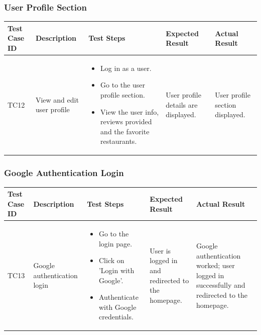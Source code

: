 \documentclass[12pt, a4paper, oneside]{article}
\begin{document}
\subsubsection{User Profile Section}
\captionsetup{type=table}
\begin{tabularx}{\textwidth}{|X|X|X|X|X|}
	\hline
	\rowcolor{gray}
	\textbf{Test Case ID} & \textbf{Description} & \textbf{Test Steps} & \textbf{Expected Result} & \textbf{Actual Result} \\ \hline
	TC12 & View and edit user profile & 
    \begin{itemize}[left=0pt, nosep]
        \item Log in as a user.
        \item Go to the user profile section.
        \item View the user info, reviews provided and the favorite restaurants.
    \end{itemize}
    & User profile details are displayed. & User profile section displayed. \\ \hline
\end{tabularx}
\label{tab:user-profile}

\subsubsection{Google Authentication Login}
\captionsetup{type=table}
\begin{tabularx}{\textwidth}{|X|X|X|X|X|}
	\hline
	\rowcolor{gray}
	\textbf{Test Case ID} & \textbf{Description} & \textbf{Test Steps} & \textbf{Expected Result} & \textbf{Actual Result} \\ \hline
	TC13 & Google authentication login & 
    \begin{itemize}[left=0pt, nosep]
        \item Go to the login page.
        \item Click on 'Login with Google'.
        \item Authenticate with Google credentials.
    \end{itemize}
    & User is logged in and redirected to the homepage. & Google authentication worked; user logged in successfully and redirected to the homepage. \\ \hline
\end{tabularx}
\label{tab:google-authentication}

\pagebreak
\end{document}
